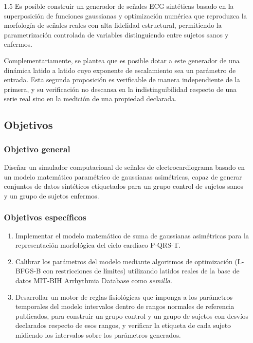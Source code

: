 \begin{spacing}{1.5}
Es posible construir un generador de señales ECG sintéticas basado en la superposición de funciones gaussianas y optimización numérica que reproduzca la morfología de señales reales con alta fidelidad estructural, permitiendo la parametrización controlada de variables distinguiendo entre sujetos sanos y enfermos.

Complementariamente, se plantea que es posible dotar a este generador de una dinámica latido a latido cuyo exponente de escalamiento sea un parámetro de entrada. Esta segunda proposición es verificable de manera independiente de la primera, y su verificación no descansa en la indistinguibilidad respecto de una serie real sino en la medición de una propiedad declarada.

\subsection{Objetivos}

\subsubsection{Objetivo general}

Diseñar un simulador computacional de señales de electrocardiograma basado en un modelo matemático paramétrico de gaussianas asimétricas, capaz de generar conjuntos de datos sintéticos etiquetados para un grupo control de sujetos sanos y un grupo de sujetos enfermos.

\subsubsection{Objetivos específicos}

\begin{enumerate}

\item Implementar el modelo matemático de suma de gaussianas asimétricas para la representación morfológica del ciclo cardíaco P-QRS-T.

\item Calibrar los parámetros del modelo mediante algoritmos de optimización (L-BFGS-B \cite{byrd1995limited} con restricciones de límites) utilizando latidos reales de la base de datos MIT-BIH Arrhythmia Database como \emph{semilla}.

\item Desarrollar un motor de reglas fisiológicas que imponga a los parámetros temporales del modelo intervalos dentro de rangos normales de referencia publicados, para construir un grupo control y un grupo de sujetos con desvíos declarados respecto de esos rangos, y verificar la etiqueta de cada sujeto midiendo los intervalos sobre los parámetros generados.


\end{enumerate}
\end{spacing}
